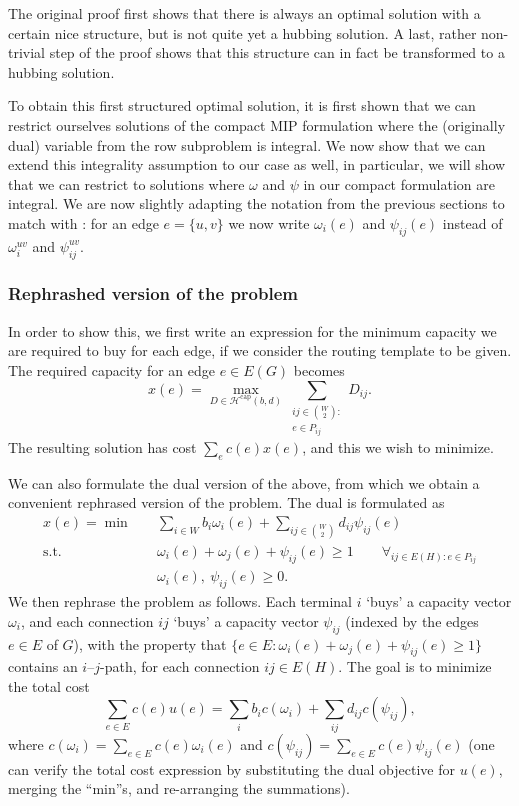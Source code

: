 The original proof first shows that there is always an optimal solution with a certain nice structure, but is not quite yet a hubbing solution.
A last, rather non-trivial step of the proof shows that this structure can in fact be transformed to a hubbing solution.


To obtain this first structured optimal solution, it is first shown that we can restrict ourselves solutions of the compact MIP formulation where the (originally dual) variable from the row subproblem is integral.
We now show that we can extend this integrality assumption to our case as well, in particular, we will show that we can restrict to solutions where $\omega$ and $\psi$ in our compact formulation are integral.
We are now slightly adapting the notation from the previous sections to match with \cite{bosman2017exploring}: for an edge $e = \{u, v\}$ we now write $\omega_i(e)$ and $\psi_{ij}(e)$ instead of $\omega_i^{uv}$ and $\psi_{ij}^{uv}$.

\subsubsection{Rephrashed version of the problem}
In order to show this, we first write an expression for the minimum capacity we are required to buy for each edge, if we consider the routing template to be given.
The required capacity for an edge $e \in E(G)$ becomes
\[
    x(e) = \max_{D \in \mathcal H^\text{cap}(b, d)} \sum_{\substack{ij \in \binom W 2 :\\e \in P_{ij}}} D_{ij}.
\]
The resulting solution has cost $\sum_e c(e) x(e)$, and this we wish to minimize.

We can also formulate the dual version of the above, from which we obtain a convenient rephrased version of the problem.
The dual is formulated as
\[
    \begin{split}
        x(e) = \min \quad & \sum_{i \in W} b_i \omega_i(e) + \sum_{ij \in \binom W 2} d_{ij} \psi_{ij}(e) \\
        \text{s.t.}\quad & \omega_i(e) + \omega_j(e) + \psi_{ij}(e) \ge 1 \qquad \forall_{ij \in E(H) : e \in P_{ij}} \\
        & \omega_i(e),\ \psi_{ij}(e) \ge 0.
    \end{split}
\]
We then rephrase the problem as follows.
Each terminal $i$ `buys' a capacity vector $\omega_i$, and each connection $ij$ `buys' a capacity vector $\psi_{ij}$ (indexed by the edges $e \in E$ of $G$), with the property that $\{ e \in E : \omega_i(e) + \omega_j(e) + \psi_{ij}(e) \ge 1 \}$ contains an $i$--$j$-path, for each connection $ij \in E(H)$.
The goal is to minimize the total cost
\[
    \sum_{e \in E} c(e) u(e) = \sum_{i} b_i c(\omega_i) + \sum_{ij} d_{ij} c(\psi_{ij}),
\]
where $c(\omega_i) = \sum_{e \in E} c(e) \omega_i(e)$ and $c(\psi_{ij}) = \sum_{e \in E} c(e) \psi_{ij}(e)$ (one can verify the total cost expression by substituting the dual objective for $u(e)$, merging the ``min''s, and re-arranging the summations).

